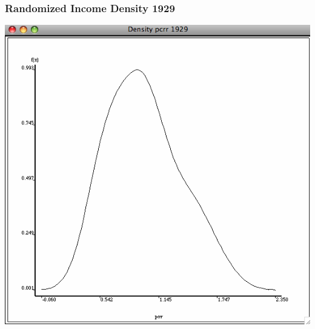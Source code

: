 \documentclass[nototal,handout]{beamer}
\begin{document}
\begin{frame}
	\frametitle{Randomized Income Density 1929}
 \begin{center}
 \includegraphics[width=.65\linewidth]{density29random.png}
  \end{center}
 \end{frame} 
\end{document}
